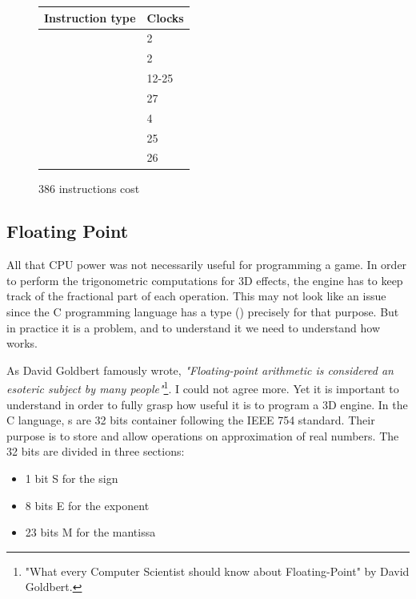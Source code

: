 \documentclass[book.tex]{subfiles}
\begin{document}
  \begin{figure}[H]
\centering  
\begin{tabularx}{\textwidth}{ X  Y }
  \toprule
  \textbf{Instruction type} &  \textbf{Clocks} \\
  \toprule 
    & 2  \\
    & 2  \\
    & 12-25\protect\footnotemark  \\
    & 27 \\
    & 4 \\
    & 25 \\
    & 26 \\
  \toprule
\end{tabularx}
\caption{386 instructions cost\protect\footnotemark}
\end{figure}
\addtocounter{footnote}{-1}





  \subsection{Floating Point}
  
   All that CPU power was not necessarily useful for programming a game. In order to perform the trigonometric computations for 3D effects, the engine has to keep track of the fractional part of each operation. This may not look like an issue since the C programming language has a type () precisely for that purpose. But in practice it is a problem, and to understand it we need to understand how  works.\\
\par
 As David Goldbert famously wrote, \emph{"Floating-point arithmetic is considered an esoteric subject by many people"}\footnote{"What every Computer Scientist should know about Floating-Point" by David Goldbert.}. I could not agree more. Yet it is important to understand in order to fully grasp how useful it is to program a 3D engine. In the C language, s are 32 bits container following the IEEE 754 standard. Their purpose is to store and allow operations on approximation of real numbers. The 32 bits are divided in three sections:\\
\begin{itemize}
  \item 1 bit S for the sign
  \item 8 bits E for the exponent
  \item 23 bits M for the mantissa
\end{itemize} 
\end{document}
